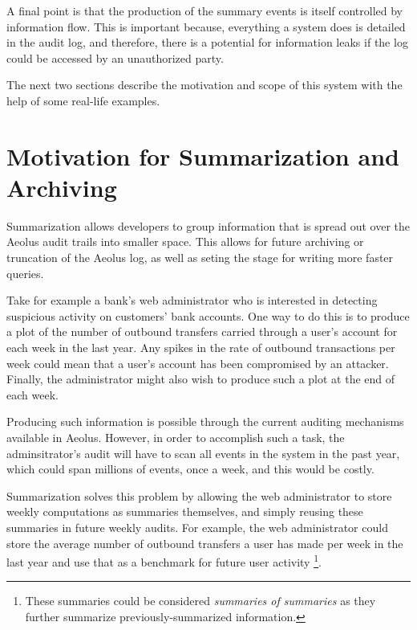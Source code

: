 A final point is that the production of the summary events is itself controlled by information flow.  This is important because, everything a system does is detailed in the audit log, and therefore, there is a potential for information leaks if the log could be accessed by an unauthorized party.

The next two sections describe the motivation and scope of this system with the help of some real-life examples.

\section{Motivation for Summarization and Archiving}

Summarization allows developers to group information that is spread out over the Aeolus audit trails into smaller space. This allows for future archiving or truncation of the Aeolus log, as well as seting the stage for writing more faster queries.

Take for example a bank's web administrator who is interested in detecting suspicious activity on customers' bank accounts. One way to do this is to produce a plot of the number of outbound transfers carried through a user's account for each week in the last year. Any spikes in the rate of outbound transactions per week could mean that a user's account has been compromised by an attacker. Finally, the administrator might also wish to produce such a plot at the end of each week.

Producing such information is possible through the current auditing mechanisms available in Aeolus. However, in order to accomplish such a task, the adminsitrator's audit will have to scan all events in the system in the past year, which could span millions of events, once a week, and this would be costly.

Summarization solves this problem by allowing the web administrator to store weekly computations as summaries themselves, and simply reusing these summaries in future weekly audits. For example, the web administrator could store the average number of outbound transfers a user has made per week in the last year and use that as a benchmark for future user activity
\footnote{These summaries could be considered \emph{summaries of summaries} as they further summarize previously-summarized information.}.

